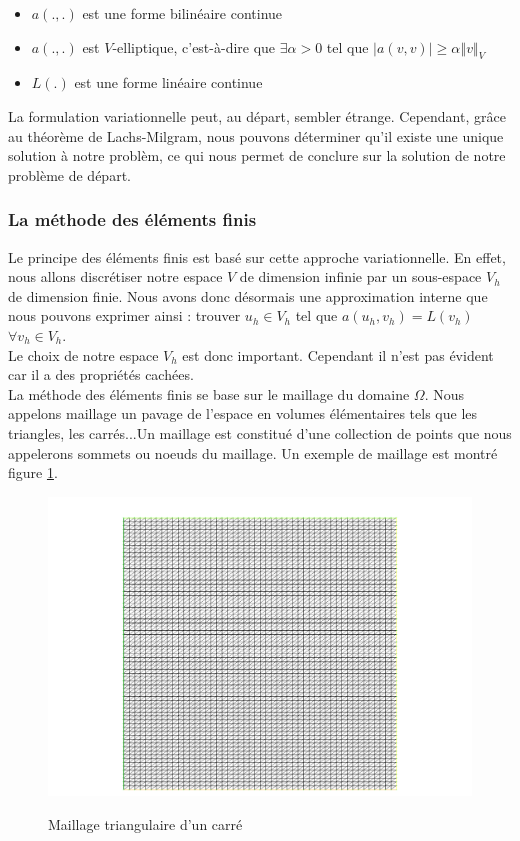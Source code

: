 \begin{itemize}
	\item $a(.,.)$ est une forme bilinéaire continue
	\item $a(.,.)$ est $V$-elliptique, c'est-à-dire que $\exists\alpha>0$ tel que $\left| a(v,v)\right| \ge \alpha\left\Vert v\right\Vert_{V}$
	\item $L(.)$ est une forme linéaire continue
\end{itemize}
La formulation variationnelle peut, au départ, sembler étrange. Cependant, grâce au théorème de Lachs-Milgram, nous pouvons déterminer qu'il existe une unique solution à notre problèm, ce qui nous permet de conclure sur la solution de notre problème de départ.\\

\subsubsection{La méthode des éléments finis}
Le principe des éléments finis est basé sur cette approche variationnelle. En effet, nous allons discrétiser notre espace $V$ de dimension infinie par un sous-espace $V_{h}$ de dimension finie. Nous avons donc désormais une approximation interne que nous pouvons exprimer ainsi : trouver $u_{h}\in V_{h}$ tel que $a(u_{h}, v_{h})=L\left(v_{h}\right)$ $\forall v_{h}\in V_h$. \\
Le choix de notre espace $V_{h}$ est donc important. Cependant il n'est pas évident car il a des propriétés cachées.\\

La méthode des éléments finis se base sur le maillage du domaine $\Omega$. Nous appelons maillage un pavage de l'espace en volumes élémentaires tels que les triangles, les carrés...Un maillage est constitué d'une collection de points que nous appelerons sommets ou noeuds du maillage. Un exemple de maillage est montré figure \ref{mail1}.
\begin{figure}[!h]
\hspace{-3em} \includegraphics[scale=0.85]{maillage-eps-converted-to.pdf}\\
\caption{Maillage triangulaire d'un carré}
\label{mail1}
\end{figure}


